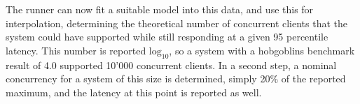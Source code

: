 \documentclass[12pt,a4paper]{article}
\begin{document}
The runner can now fit a suitable model into this data, and use this for
interpolation, determining the theoretical number of concurrent clients that the
system could have supported while still responding at a given 95 percentile
latency. This number is reported $\textrm{log}_{10}$, so a system with a hobgoblins
benchmark result of 4.0 supported 10'000 concurrent clients. In a second step, a
nominal concurrency for a system of this size is determined, simply 20\% of the
reported maximum, and the latency at this point is reported as well.

\end{document}
